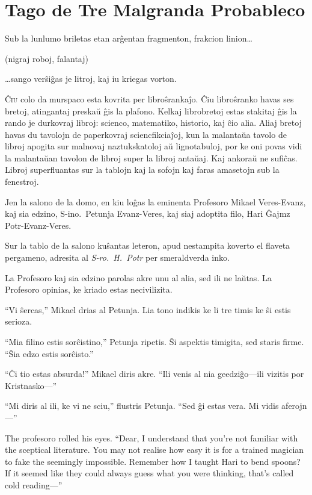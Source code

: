 \chapter{Tago de Tre Malgranda Probableco}

\begin{chapterOpeningQuote}
\noindent
Sub la lunlumo briletas etan arĝentan fragmenton, frakcion linion…

\vspace*{2ex}
(nigraj roboj, falantaj)

\vspace*{2ex}
…sango verŝiĝas je litroj, kaj iu kriegas vorton.
\end{chapterOpeningQuote}

\lettrine{Ĉ}{iu} colo da murspaco esta kovrita per libroŝrankaĵo. Ĉiu libroŝranko havas ses bretoj, atingantaj preskaŭ ĝis la plafono. Kelkaj librobretoj estas stakitaj ĝis la rando je durkovraj libroj: scienco, matematiko, historio, kaj ĉio alia. Aliaj bretoj havas du tavolojn de paperkovraj sciencfikciaĵoj, kun la malantaŭa tavolo de libroj apogita sur malnovaj naztukskatoloj aŭ lignotabuloj, por ke oni povas vidi la malantaŭan tavolon de libroj super la libroj antaŭaj. Kaj ankoraŭ ne sufiĉas. Libroj superfluantas sur la tablojn kaj la sofojn kaj faras amasetojn sub la fenestroj.

Jen la salono de la domo, en kiu loĝas la eminenta Profesoro Mikael Veres\nobreakdash-Evanz, kaj sia edzino, S\nobreakdash-ino.~Petunja Evanz\nobreakdash-Veres, kaj siaj adoptita filo, Hari Ĝajmz Potr-Evanz-Veres.

Sur la tablo de la salono kuŝantas leteron, apud nestampita koverto el flaveta pergameno, adresita al \emph{S\nobreakdash-ro.~H.~Potr} per smeraldverda inko.

La Profesoro kaj sia edzino parolas akre unu al alia, sed ili ne laŭtas. La Profesoro opinias, ke kriado estas necivilizita.

“Vi ŝercas,” Mikael drias al Petunja. Lia tono indikis ke li tre timis ke ŝi estis serioza.

“Mia filino estis sorĉistino,” Petunja ripetis. Ŝi aspektis timigita, sed staris firme. “Ŝia edzo estis sorĉisto.”

“Ĉi tio estas absurda!” Mikael diris akre. “Ili venis al nia geedziĝo—ili vizitis por Kristnasko—”

“Mi diris al ili, ke vi ne sciu,” flustris Petunja. “Sed ĝi estas vera. Mi vidis aferojn—”

The profesoro rolled his eyes. “Dear, I understand that you’re not familiar with the sceptical literature. You may not realise how easy it is for a trained magician to fake the seemingly impossible. Remember how I taught Hari to bend spoons? If it seemed like they could always guess what you were thinking, that’s called cold reading—”

